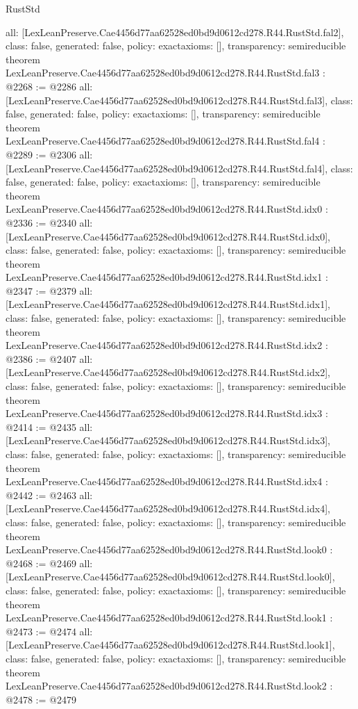\begin{lexlean}{RustStd}
\begin{coremodule}
{  all: [LexLeanPreserve.Cae4456d77aa62528ed0bd9d0612cd278.R44.RustStd.fal2],
  class: false,
  generated: false,
  policy: exact{axioms: []},
  transparency: semireducible
}
theorem LexLeanPreserve.Cae4456d77aa62528ed0bd9d0612cd278.R44.RustStd.fal3 : @2268 := @2286 {
  all: [LexLeanPreserve.Cae4456d77aa62528ed0bd9d0612cd278.R44.RustStd.fal3],
  class: false,
  generated: false,
  policy: exact{axioms: []},
  transparency: semireducible
}
theorem LexLeanPreserve.Cae4456d77aa62528ed0bd9d0612cd278.R44.RustStd.fal4 : @2289 := @2306 {
  all: [LexLeanPreserve.Cae4456d77aa62528ed0bd9d0612cd278.R44.RustStd.fal4],
  class: false,
  generated: false,
  policy: exact{axioms: []},
  transparency: semireducible
}
theorem LexLeanPreserve.Cae4456d77aa62528ed0bd9d0612cd278.R44.RustStd.idx0 : @2336 := @2340 {
  all: [LexLeanPreserve.Cae4456d77aa62528ed0bd9d0612cd278.R44.RustStd.idx0],
  class: false,
  generated: false,
  policy: exact{axioms: []},
  transparency: semireducible
}
theorem LexLeanPreserve.Cae4456d77aa62528ed0bd9d0612cd278.R44.RustStd.idx1 : @2347 := @2379 {
  all: [LexLeanPreserve.Cae4456d77aa62528ed0bd9d0612cd278.R44.RustStd.idx1],
  class: false,
  generated: false,
  policy: exact{axioms: []},
  transparency: semireducible
}
theorem LexLeanPreserve.Cae4456d77aa62528ed0bd9d0612cd278.R44.RustStd.idx2 : @2386 := @2407 {
  all: [LexLeanPreserve.Cae4456d77aa62528ed0bd9d0612cd278.R44.RustStd.idx2],
  class: false,
  generated: false,
  policy: exact{axioms: []},
  transparency: semireducible
}
theorem LexLeanPreserve.Cae4456d77aa62528ed0bd9d0612cd278.R44.RustStd.idx3 : @2414 := @2435 {
  all: [LexLeanPreserve.Cae4456d77aa62528ed0bd9d0612cd278.R44.RustStd.idx3],
  class: false,
  generated: false,
  policy: exact{axioms: []},
  transparency: semireducible
}
theorem LexLeanPreserve.Cae4456d77aa62528ed0bd9d0612cd278.R44.RustStd.idx4 : @2442 := @2463 {
  all: [LexLeanPreserve.Cae4456d77aa62528ed0bd9d0612cd278.R44.RustStd.idx4],
  class: false,
  generated: false,
  policy: exact{axioms: []},
  transparency: semireducible
}
theorem LexLeanPreserve.Cae4456d77aa62528ed0bd9d0612cd278.R44.RustStd.look0 : @2468 := @2469 {
  all: [LexLeanPreserve.Cae4456d77aa62528ed0bd9d0612cd278.R44.RustStd.look0],
  class: false,
  generated: false,
  policy: exact{axioms: []},
  transparency: semireducible
}
theorem LexLeanPreserve.Cae4456d77aa62528ed0bd9d0612cd278.R44.RustStd.look1 : @2473 := @2474 {
  all: [LexLeanPreserve.Cae4456d77aa62528ed0bd9d0612cd278.R44.RustStd.look1],
  class: false,
  generated: false,
  policy: exact{axioms: []},
  transparency: semireducible
}
theorem LexLeanPreserve.Cae4456d77aa62528ed0bd9d0612cd278.R44.RustStd.look2 : @2478 := @2479 {
}
\end{coremodule}
\end{lexlean}
